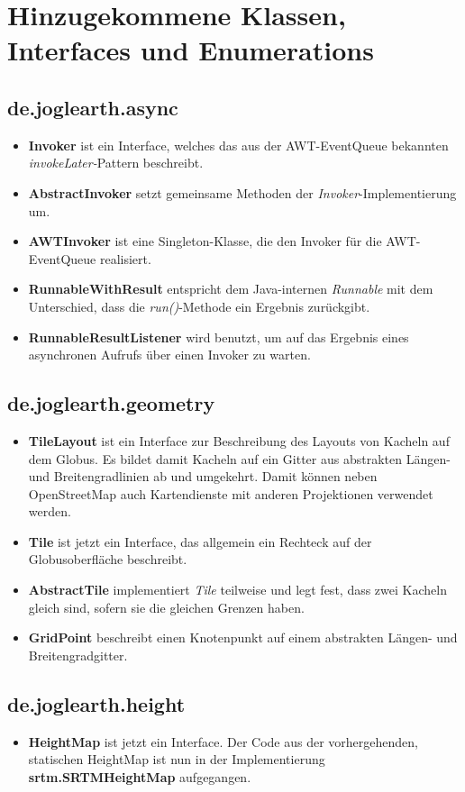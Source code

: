 \documentclass[10pt]{scrreprt}
\begin{document}
\section{Hinzugekommene Klassen, Interfaces und Enumerations}
\subsection*{de.joglearth.async}
\begin{itemize}
\item \textbf{Invoker} ist ein Interface, welches das aus der AWT-EventQueue bekannten \textit{invokeLater-}Pattern beschreibt.
\item \textbf{AbstractInvoker} setzt gemeinsame Methoden der \textit{Invoker}-Implementierung um.
\item \textbf{AWTInvoker} ist eine Singleton-Klasse, die den Invoker für die AWT-EventQueue realisiert.
\item \textbf{RunnableWithResult} entspricht dem Java-internen \textit{Runnable} mit dem Unterschied, dass die \textit{run()}-Methode ein Ergebnis zurückgibt.
\item \textbf{RunnableResultListener} wird benutzt, um auf das Ergebnis eines asynchronen Aufrufs über einen Invoker zu warten.
\end{itemize}

\subsection*{de.joglearth.geometry}
\begin{itemize}
\item \textbf{TileLayout} ist ein Interface zur Beschreibung des Layouts von Kacheln auf dem Globus. Es bildet damit Kacheln auf ein Gitter aus abstrakten Längen- und Breitengradlinien ab und umgekehrt. Damit können neben OpenStreetMap auch Kartendienste mit anderen Projektionen verwendet werden.
\item \textbf{Tile} ist jetzt ein Interface, das allgemein ein Rechteck auf der Globusoberfläche beschreibt.
\item \textbf{AbstractTile} implementiert \textit{Tile} teilweise und legt fest, dass zwei Kacheln gleich sind, sofern sie die gleichen Grenzen haben.
\item \textbf{GridPoint} beschreibt einen Knotenpunkt auf einem abstrakten Längen- und Breitengradgitter.
\end{itemize}

\subsection*{de.joglearth.height}
\begin{itemize}
\item \textbf{HeightMap} ist jetzt ein Interface. Der Code aus der vorhergehenden, statischen HeightMap ist nun in der Implementierung \textbf{srtm.SRTMHeightMap} aufgegangen. 
\end{itemize}
\end{document}
